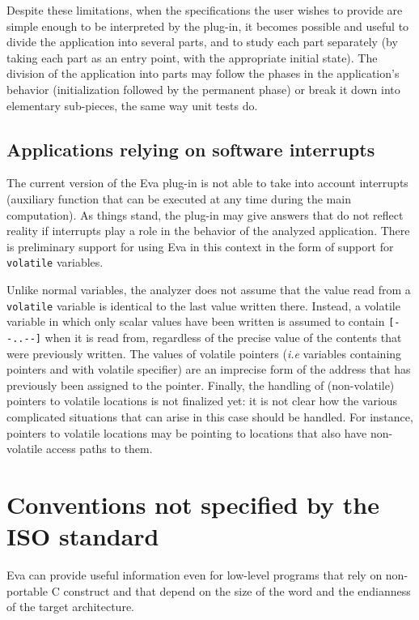 \documentclass[web]{frama-c-book}
\newcommand{\Eva}{\textsf{Eva}}
\begin{document}
Despite these limitations, when the specifications the user wishes to
provide are simple enough to be interpreted by the plug-in, it becomes
possible and useful to divide the application into several parts, and
to study each part separately (by taking each part as an entry point,
with the appropriate initial state). The division of the application
into parts may follow the phases in the application's behavior
(initialization followed by the permanent phase)
or break it down into elementary sub-pieces, the same way unit tests do.

\subsection{Applications relying on software interrupts}

The current version of the \Eva{} plug-in is not able to
take into account
interrupts (auxiliary function that can be executed at any time
during the main computation). As things stand, the plug-in may give
answers that do not reflect reality if interrupts play a role
in the behavior of the analyzed application. 
There is preliminary support for using \Eva{} in this
context in the form of support for \lstinline|volatile| variables.

Unlike normal variables, the analyzer does not assume that
the value read from a \lstinline|volatile|
variable is identical to the last value written there. Instead, 
a volatile variable in which only scalar values have been written
is assumed to contain \lstinline|[--..--]| when it is read from,
regardless of the precise value of the contents
that were previously written.
%
The values of volatile pointers ({\it i.e} variables containing pointers and
with volatile specifier)
are an imprecise form of the address that has previously been assigned to
the pointer. Finally, the handling of (non-volatile) pointers to volatile
locations is not finalized yet: it is not clear how the various complicated
situations that can arise in this case should be handled. For instance,
pointers to volatile locations may be pointing to locations that
also have non-volatile access paths to them.

\section{Conventions not specified by the ISO standard}

\Eva{} can provide useful information even for low-level
programs that rely on non-portable C construct and that depend
on the size of the word and the endianness of the target architecture.
\end{document}
